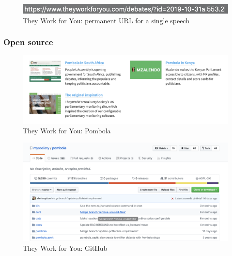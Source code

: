 \documentclass{article}
\begin{document}
			\begin{figure}
				\centering
				\includegraphics[scale=0.5]{images/they-work-for-you-implementation-permanent-urls-3}
				\caption{They Work for You: permanent URL for a single speech}
				\label{fig:they-work-for-you-implementation-permanent-urls-3}
			\end{figure}
					
        	\subsubsection*{Open source}
        	

			\begin{figure}
				\centering
				\includegraphics[scale=0.4]{images/they-work-for-you-implementation-open-source-pombola}
				\caption{They Work for You: Pombola}
				\label{fig:they-work-for-you-implementation-open-source-pombola}
			\end{figure}
			
			\begin{figure}
				\centering
				\includegraphics[scale=0.4]{images/they-work-for-you-implementation-open-source-github}
				\caption{They Work for You: GitHub}
				\label{fig:they-work-for-you-implementation-open-source-github}
			\end{figure}
						
\end{document}
